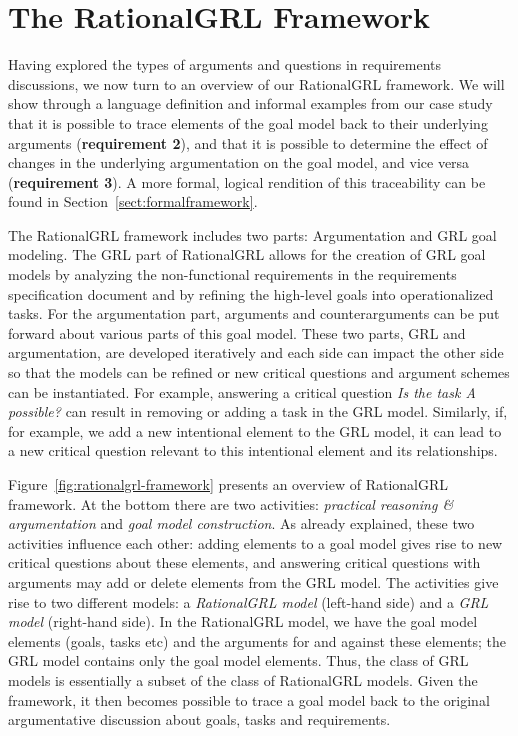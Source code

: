 \section{The RationalGRL Framework}
\label{sect:overview}

Having explored the types of arguments and questions in requirements discussions, we now turn to an overview of our RationalGRL framework. We will show through a language definition and informal examples from our case study that it is possible to trace elements of the goal model back to their underlying arguments (\textbf{requirement 2}), and that it is possible to determine the effect of changes in the underlying argumentation on the goal model, and vice versa (\textbf{requirement 3}). A more formal, logical rendition of this traceability can be found in Section~\ref{sect:formalframework}.

The RationalGRL framework includes two parts: Argumentation and GRL goal modeling. The GRL part of RationalGRL allows for the creation of GRL goal models by analyzing the non-functional requirements in the requirements specification document and by refining the high-level goals into operationalized tasks. For the argumentation part, arguments and counterarguments can be put forward about various parts of this goal model. These two parts, GRL and argumentation, are developed iteratively and each side can impact the other side so that the models can be refined or new critical questions and argument schemes can be instantiated. For example, answering a critical question \emph{Is the task \emph{A} possible?} can result in removing or adding a task in the GRL model. Similarly,  if, for example, we add a new intentional element to the GRL model, it can lead to a new critical question relevant to this intentional element and its relationships.  

Figure~\ref{fig:rationalgrl-framework} presents an overview of RationalGRL framework. At the bottom there are two activities: \emph{practical reasoning \& argumentation} and \emph{goal model construction}. As already explained, these two activities influence each other: adding elements to a goal model gives rise to new critical questions about these elements, and answering critical questions with arguments may add or delete elements from the GRL model. The activities give rise to two different models: a \emph{RationalGRL model} (left-hand side) and a \emph{GRL model} (right-hand side). In the RationalGRL model, we have the goal model elements (goals, tasks etc) and the arguments for and against these elements; the GRL model contains only the goal model elements. Thus, the class of GRL models is essentially a subset of the class of RationalGRL models. Given the framework, it then becomes possible to trace a goal model back to the original argumentative discussion about goals, tasks and requirements. 

